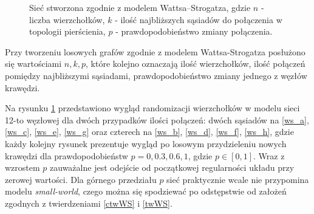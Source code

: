 \documentclass[a4paper, 12pt, twoside, openright]{article}
\begin{document}
\begin{figure}[!p]
	\quad
	\quad
	\quad
		
	\caption[]{Sieć stworzona zgodnie z modelem Wattsa–Strogatza, gdzie $n$ - liczba wierzchołków, $k$ - ilość najbliższych sąsiadów do połączenia w topologii pierścienia, $p$ - prawdopodobieństwo zmiany połączenia.}
	\label{WattsImg1}
\end{figure}

	Przy tworzeniu losowych grafów zgodnie z modelem Wattsa-Strogatza posłużono się wartościami $n,k,p$, które kolejno oznaczają ilość wierzchołków, ilość połączeń pomiędzy najbliższymi sąsiadami, prawdopodobieństwo zmiany jednego z węzłów krawędzi.
	
	Na rysunku \ref{WattsImg1} przedstawiono wygląd randomizacji wierzchołków w modelu sieci 12-to węzłowej dla dwóch przypadków ilości połączeń: dwóch sąsiadów na \ref{ws_a}, \ref{ws_c}, \ref{ws_e}, \ref{ws_g} oraz czterech na \ref{ws_b}, \ref{ws_d}, \ref{ws_f}, \ref{ws_h}, gdzie każdy kolejny rysunek prezentuje wygląd po losowym przydzieleniu nowych krawędzi dla prawdopodobieństw $p = 0, 0.3, 0.6, 1$, gdzie $p \in [0, 1]$. Wraz z wzrostem $p$ zauważalne jest odejście od początkowej regularności układu przy zerowej wartości. Dla górnego przedziału $p$ sieć praktycznie wcale nie przypomina modelu \textit{small-world}, czego można się spodziewać po odstępstwie od założeń zgodnych z twierdzeniami \ref{ctwWS} i \ref{twWS}.
	
\end{document}
